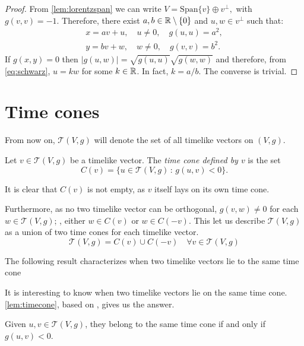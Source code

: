 \begin{proof}
    From \autoref{lem:lorentzspan} we can write $V=\mathrm{Span}\{v\}\oplus v^{\perp},$ with $g(v,v)=-1$. Therefore, there exist $a,b \in \mathbb{R}\setminus\{0\}$ and $u,w \in v^\perp$ such that:
    \begin{align*}
        x=av+u, \quad u\neq 0, \quad g(u,u)=a^2,\\
        y=bv+w, \quad w\neq 0, \quad g(v,v)=b^2.
    \end{align*}
    If $g(x,y)=0$ then $\lvert g(u,w) \rvert = \sqrt{g(u,u)}\sqrt{g(w,w)}$ and therefore, from \autoref{eq:schwarz}, $u=kw$ for some $k\in \mathbb{R}$. In fact, $k=a/b$. The converse is trivial.
\end{proof}

\section{Time cones}

From now on, $\mathcal{T}(V,g)$ will denote the set of all timelike vectors on $(V,g)$.

\begin{definition}
	Let $v\in \mathcal{T}(V,g)$ be a timelike vector. The \emph{time cone defined by $v$} is the set
	\[
	C(v)=\{u\in\mathcal{T}(V,g)\, : \, g(u,v)<0 \}.
	\]
\end{definition}

It is clear that $C(v)$ is not empty, as $v$ itself lays on its own time cone.

Furthermore, as no two timelike vector can be orthogonal, $g(v,w) \neq 0$ for each $w \in \mathcal{T}(V,g)$; \ie, either $w\in C(v)$ or $w\in C(-v)$. This let us describe $\mathcal{T}(V,g)$ as a union of two time cones for each timelike vector.
\[
\mathcal{T}(V,g) = C(v) \cup C(-v) \quad \forall v\in \mathcal{T}(V,g)
\]

 The following result characterizes
when two timelike vectors lie to the same time cone 

It is interesting to know when two timelike vectors lie on the same time cone. \autoref{lem:timecone}, based on \cite[Lemma 5.29]{oneill83}, gives us the answer.

\begin{lemma}\label{lem:timecone}
Given $u,v\in \mathcal{T}(V,g)$, they belong to the same time cone if and only if $g(u,v)<0$.
\end{lemma}

